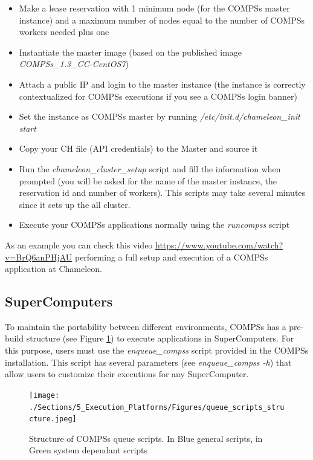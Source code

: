 \begin{itemize}
 \item Make a lease reservation with 1 minimum node (for the COMPSs master instance) and a maximum number of nodes equal to the
 number of COMPSs workers needed plus one
 \item Instantiate the master image (based on the published image \textit{COMPSs\_1.3\_CC-CentOS7})
 \item Attach a public IP and login to the master instance (the instance is correctly contextualized for COMPSs executions if you
 see a COMPSs login banner)
 \item Set the instance as COMPSs master by running \textit{/etc/init.d/chameleon\_init start}
 \item Copy your CH file (API credentials) to the Master and source it
 \item Run the \textit{chameleon\_cluster\_setup} script and fill the information when prompted (you will be asked for the name of the
 master instance, the reservation id and number of workers). This scripts may take several minutes since it sets up the all cluster.
 \item Execute your COMPSs applications normally using the \textit{runcompss} script
\end{itemize}

As an example you can check this video \url{https://www.youtube.com/watch?v=BrQ6anPHjAU} performing a full setup and 
execution of a COMPSs application at Chameleon.


\subsection{SuperComputers}

To maintain the portability between different environments, COMPSs has a pre-build structure (see Figure 
\ref{fig:queue_scripts_structure}) to execute applications in SuperComputers. For this purpose, users must use 
the \textit{enqueue\_compss} script provided in the COMPSs installation. This script has several parameters (see 
\textit{enqueue\_compss -h}) that allow users to customize their executions for any SuperComputer.

\begin{figure}[h!]
  \centering
    \texttt{[image: ./Sections/5\_Execution\_Platforms/Figures/queue\_scripts\_structure.jpeg]}
    \caption{Structure of COMPSs queue scripts. In Blue general scripts, in Green system dependant scripts}
    \label{fig:queue_scripts_structure}
\end{figure}

